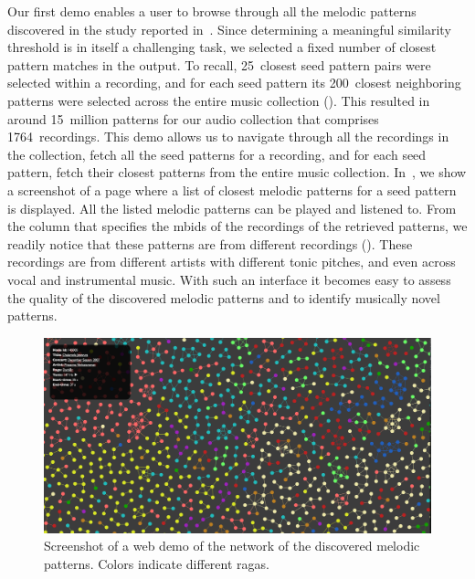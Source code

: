 Our first demo enables a user to browse through all the melodic patterns discovered in the study reported in~. Since determining a meaningful similarity threshold is in itself a challenging task, we selected a fixed number of closest pattern matches in the output. To recall, 25~closest seed pattern pairs were selected within a recording, and for each seed pattern its 200~closest neighboring patterns were selected across the entire music collection (). This resulted in around 15~million patterns for our audio collection that comprises 1764~recordings. This demo allows us to navigate through all the recordings in the collection, fetch all the seed patterns for a recording, and for each seed pattern, fetch their closest patterns from the entire music collection. In~, we show a screenshot of a page where a list of closest melodic patterns for a seed pattern is displayed. All the listed melodic patterns can be played and listened to. From the column that specifies the \glspl{mbid} of the recordings of the retrieved patterns, we readily notice that these patterns are from different recordings (). These recordings are from different artists with different tonic pitches, and even across vocal and instrumental music. With such an interface it becomes easy to assess the quality of the discovered melodic patterns and to identify musically novel patterns. 

\begin{figure}
	\begin{center}
		\includegraphics[width=\figSizeHundred]{ch08_applications/figures/patternNetwork1.png}
	\end{center}
	\caption[A web demo of a network of the discovered melodic patterns]{Screenshot of a web demo of the network of the discovered melodic patterns. Colors indicate different \glspl{raga}.}
	\label{fig:network_patterns}
\end{figure}

